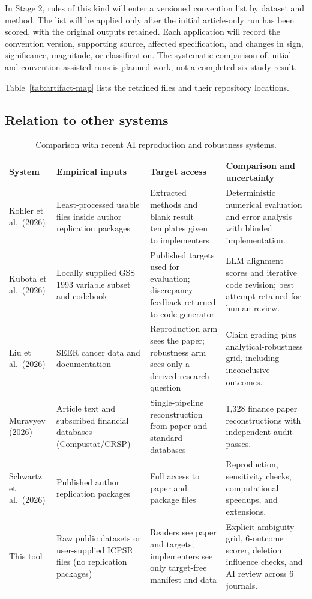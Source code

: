 \documentclass[11pt]{article}
\begin{document}
In Stage 2, rules of this kind will enter a versioned convention list by dataset and method. The list will be applied only after the initial article-only run has been scored, with the original outputs retained. Each application will record the convention version, supporting source, affected specification, and changes in sign, significance, magnitude, or classification. The systematic comparison of initial and convention-assisted runs is planned work, not a completed six-study result.

Table~\ref{tab:artifact-map} lists the retained files and their repository locations.

\subsection{Relation to other systems}
\begin{table}[H]\centering\small
\begin{tabularx}{\linewidth}{@{}p{.19\linewidth}YYY@{}}\toprule
System & Empirical inputs & Target access & Comparison and uncertainty\\\midrule
Kohler et al.\ (2026) & Least-processed usable files inside author replication packages & Extracted methods and blank result templates given to implementers & Deterministic numerical evaluation and error analysis with blinded implementation.\\
Kubota et al.\ (2026) & Locally supplied GSS 1993 variable subset and codebook & Published targets used for evaluation; discrepancy feedback returned to code generator & LLM alignment scores and iterative code revision; best attempt retained for human review.\\
Liu et al.\ (2026) & SEER cancer data and documentation & Reproduction arm sees the paper; robustness arm sees only a derived research question & Claim grading plus analytical-robustness grid, including inconclusive outcomes.\\
Muravyev (2026) & Article text and subscribed financial databases (Compustat/CRSP) & Single-pipeline reconstruction from paper and standard databases & 1,328 finance paper reconstructions with independent audit passes.\\
Schwartz et al.\ (2026) & Published author replication packages & Full access to paper and package files & Reproduction, sensitivity checks, computational speedups, and extensions.\\
This tool & Raw public datasets or user-supplied ICPSR files (no replication packages) & Readers see paper and targets; implementers see only target-free manifest and data & Explicit ambiguity grid, 6-outcome scorer, deletion influence checks, and AI review across 6 journals.\\\bottomrule
\end{tabularx}\caption{Comparison with recent AI reproduction and robustness systems.}\end{table}
\end{document}
